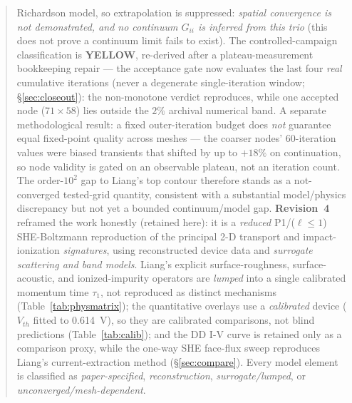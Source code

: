\documentclass[11pt]{article}
\begin{document}
\begin{abstract}
Richardson model, so extrapolation is suppressed: \emph{spatial convergence is not demonstrated, and no
continuum $G_{ii}$ is inferred from this trio} (this does not prove a continuum limit fails to exist).
The controlled-campaign classification is \textbf{YELLOW}, re-derived after a plateau-measurement
bookkeeping repair --- the acceptance gate now evaluates the last four \emph{real} cumulative
iterations (never a degenerate single-iteration window; \S\ref{sec:closeout}): the non-monotone
verdict reproduces, while one accepted node ($71{\times}58$) lies outside the $2\%$ archival numerical
band.
A separate methodological result: a fixed outer-iteration budget does \emph{not} guarantee equal
fixed-point quality across meshes --- the coarser nodes' 60-iteration values were biased transients
that shifted by up to $+18\%$ on continuation, so node validity is gated on an observable plateau,
not an iteration count. The order-$10^{2}$ gap to Liang's top contour therefore stands as a
not-converged tested-grid quantity, consistent with a substantial model/physics discrepancy but not
yet a bounded continuum/model gap.
\textbf{Revision~4} reframed the work honestly (retained here): it
is a \emph{reduced} P1/($\ell\le1$) SHE-Boltzmann reproduction of the principal 2-D transport and
impact-ionization \emph{signatures}, using reconstructed device data and \emph{surrogate scattering
and band models}. Liang's explicit surface-roughness, surface-acoustic, and ionized-impurity
operators are \emph{lumped} into a single calibrated momentum time $\tau_1$, not reproduced as
distinct mechanisms (Table~\ref{tab:physmatrix}); the quantitative overlays use a \emph{calibrated}
device ($V_{th}$ fitted to \SI{0.614}{V}), so they are calibrated comparisons, not blind
predictions (Table~\ref{tab:calib}); and the DD I-V curve is retained only as a comparison proxy,
while the one-way SHE face-flux sweep reproduces Liang's current-extraction method
(\S\ref{sec:compare}). Every model element is classified as \emph{paper-specified},
\emph{reconstruction}, \emph{surrogate/lumped}, or \emph{unconverged/mesh-dependent}.
\end{abstract}

\tableofcontents
\end{document}
